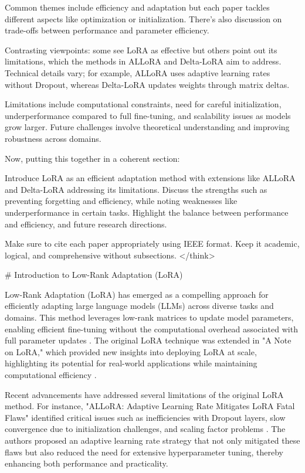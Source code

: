 \documentclass[conference]{IEEEtran}
\begin{document}
Common themes include efficiency and adaptation but each paper tackles different aspects like optimization or initialization. There's also discussion on trade-offs between performance and parameter efficiency.

Contrasting viewpoints: some see LoRA as effective but others point out its limitations, which the methods in ALLoRA and Delta-LoRA aim to address. Technical details vary; for example, ALLoRA uses adaptive learning rates without Dropout, whereas Delta-LoRA updates weights through matrix deltas.

Limitations include computational constraints, need for careful initialization, underperformance compared to full fine-tuning, and scalability issues as models grow larger. Future challenges involve theoretical understanding and improving robustness across domains.

Now, putting this together in a coherent section:

Introduce LoRA as an efficient adaptation method with extensions like ALLoRA and Delta-LoRA addressing its limitations. Discuss the strengths such as preventing forgetting and efficiency, while noting weaknesses like underperformance in certain tasks. Highlight the balance between performance and efficiency, and future research directions.

Make sure to cite each paper appropriately using IEEE format. Keep it academic, logical, and comprehensive without subsections.
</think>

# Introduction to Low-Rank Adaptation (LoRA)

Low-Rank Adaptation (LoRA) has emerged as a compelling approach for efficiently adapting large language models (LLMs) across diverse tasks and domains. This method leverages low-rank matrices to update model parameters, enabling efficient fine-tuning without the computational overhead associated with full parameter updates \cite{b1}. The original LoRA technique was extended in "A Note on LoRA," which provided new insights into deploying LoRA at scale, highlighting its potential for real-world applications while maintaining computational efficiency \cite{b1}.

Recent advancements have addressed several limitations of the original LoRA method. For instance, "ALLoRA: Adaptive Learning Rate Mitigates LoRA Fatal Flaws" identified critical issues such as inefficiencies with Dropout layers, slow convergence due to initialization challenges, and scaling factor problems \cite{b2}. The authors proposed an adaptive learning rate strategy that not only mitigated these flaws but also reduced the need for extensive hyperparameter tuning, thereby enhancing both performance and practicality.
\end{document}
